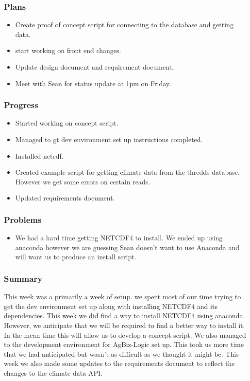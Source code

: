 \documentclass[onecolumn, draftclsnofoot,10pt, compsoc]{article}
\begin{document}
			\subsubsection{Plans}
				\begin{itemize}
					\item Create proof of concept script for connecting to the database and getting data.
					\item start working on front end changes.
					\item Update design document and requirement document.
					\item Meet with Sean for status update at 1pm on Friday.
				\end{itemize}
			\subsubsection{Progress}
				\begin{itemize}
					\item Started working on concept script.
					\item Managed to gt dev environment set up instructions completed.
					\item Installed netcdf.
					\item Created example script for getting climate data from the thredds database. However we get some errors on certain reads.
					\item Updated requirements document.
				\end{itemize}
			\subsubsection{Problems}
				\begin{itemize}
					\item We had a hard time getting NETCDF4 to install. We ended up using anaconda however we are guessing Sean doesn't want to use Anaconda and will want us to produce an install script.\\
				\end{itemize}
			\subsubsection{Summary}
			This week was a primarily a week of setup. we spent most of our time trying to get the dev environment set up along with installing NETCDF4 and its dependencies. This week we did find a way to install NETCDF4 using anaconda. However, we anticipate that we will be required to find a better way to install it. In the mean time this will allow us to develop a concept script. We also managed to the development environment for AgBiz-Logic set up. This took us more time that we had anticipated but wasn't as difficult as we thought it might be. This week we also made some updates to the requirements document to reflect the changes to the climate data API.\\
\end{document}

